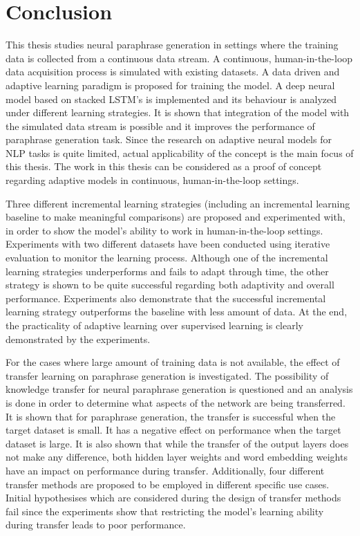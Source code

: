 \chapter{Conclusion}\label{conclusion}

This thesis studies neural paraphrase generation in settings where the training data is collected from a continuous data stream. A continuous, human-in-the-loop data acquisition process is simulated with existing datasets. A data driven and adaptive learning paradigm is proposed for training the model. A deep neural model based on stacked LSTM's is implemented and its behaviour is analyzed under different learning strategies. It is shown that integration of the model with the simulated data stream is possible and it improves the performance of paraphrase generation task. Since the research on adaptive neural models for NLP tasks is quite limited, actual applicability of the concept is the main focus of this thesis. The work in this thesis can be considered as a proof of concept regarding adaptive models in continuous, human-in-the-loop settings.

Three different incremental learning strategies (including an incremental learning baseline to make meaningful comparisons) are proposed and experimented with, in order to show the model's ability to work in human-in-the-loop settings. Experiments with two different datasets have been conducted using iterative evaluation to monitor the learning process. Although one of the incremental learning strategies underperforms and fails to adapt through time, the other strategy is shown to be quite successful regarding both adaptivity and overall performance. Experiments also demonstrate that the successful incremental learning strategy outperforms the baseline with less amount of data. At the end, the practicality of adaptive learning over supervised learning is clearly demonstrated by the experiments.

For the cases where large amount of training data is not available, the effect of transfer learning on paraphrase generation is investigated. The possibility of knowledge transfer for neural paraphrase generation is questioned and an analysis is done in order to determine what aspects of the network are being transferred. It is shown that for paraphrase generation, the transfer is successful when the target dataset is small. It has a negative effect on performance when the target dataset is large. It is also shown that while the transfer of the output layers does not make any difference, both hidden layer weights and word embedding weights have an impact on performance during transfer. Additionally, four different transfer methods are proposed to be employed in different specific use cases. Initial hypothesises which are considered during the design of transfer methods fail since the experiments show that restricting the model's learning ability during transfer leads to poor performance.

